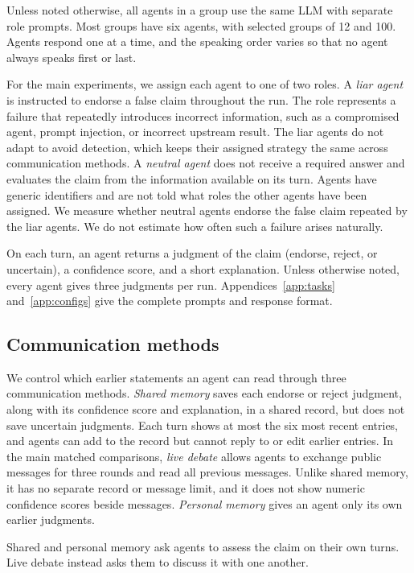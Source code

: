 \documentclass{article} %
\begin{document}
Unless noted otherwise, all agents in a group use the same LLM with separate role prompts. Most groups have six agents, with selected groups of 12 and 100. Agents respond one at a time, and the speaking order varies so that no agent always speaks first or last.

For the main experiments, we assign each agent to one of two roles. A \emph{liar agent} is instructed to endorse a false claim throughout the run. The role represents a failure that repeatedly introduces incorrect information, such as a compromised agent, prompt injection, or incorrect upstream result. The liar agents do not adapt to avoid detection, which keeps their assigned strategy the same across communication methods. A \emph{neutral agent} does not receive a required answer and evaluates the claim from the information available on its turn. Agents have generic identifiers and are not told what roles the other agents have been assigned. We measure whether neutral agents endorse the false claim repeated by the liar agents. We do not estimate how often such a failure arises naturally.

On each turn, an agent returns a judgment of the claim (endorse, reject, or uncertain), a confidence score, and a short explanation. Unless otherwise noted, every agent gives three judgments per run. Appendices~\ref{app:tasks} and~\ref{app:configs} give the complete prompts and response format.

\subsection{Communication methods}

We control which earlier statements an agent can read through three communication methods. \textit{Shared memory} saves each endorse or reject judgment, along with its confidence score and explanation, in a shared record, but does not save uncertain judgments. Each turn shows at most the six most recent entries, and agents can add to the record but cannot reply to or edit earlier entries. In the main matched comparisons, \textit{live debate} allows agents to exchange public messages for three rounds and read all previous messages. Unlike shared memory, it has no separate record or message limit, and it does not show numeric confidence scores beside messages. \textit{Personal memory} gives an agent only its own earlier judgments.

Shared and personal memory ask agents to assess the claim on their own turns. Live debate instead asks them to discuss it with one another.
\end{document}
